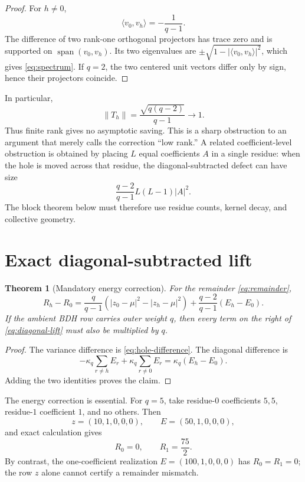 \documentclass[11pt]{article}
\newtheorem{theorem}{Theorem}[section]
\begin{document}
\begin{proof}
For $h\ne0$,
\[
 \langle v_0,v_h\rangle=-\frac1{q-1}.
\]
The difference of two rank-one orthogonal projectors has trace zero and is
supported on $\operatorname{span}(v_0,v_h)$.  Its two eigenvalues are
$\pm\sqrt{1-|\langle v_0,v_h\rangle|^2}$, which gives
\eqref{eq:spectrum}.  If $q=2$, the two centered unit vectors differ only by
sign, hence their projectors coincide.
\end{proof}

In particular,
\[
 \|T_h\|=\frac{\sqrt{q(q-2)}}{q-1}\longrightarrow1.
\]
Thus finite rank gives no asymptotic saving.  This is a sharp obstruction to
an argument that merely calls the correction ``low rank.''  A related
coefficient-level obstruction is obtained by placing $L$ equal coefficients
$A$ in a single residue: when the hole is moved across that residue, the
diagonal-subtracted defect can have size
\[
 \frac{q-2}{q-1}L(L-1)|A|^2.
\]
The block theorem below must therefore use residue counts, kernel decay, and
collective geometry.

\section{Exact diagonal-subtracted lift}

\begin{theorem}[Mandatory energy correction]\label{thm:diagonal}
For the remainder \eqref{eq:remainder},
\begin{equation}\label{eq:diagonal-lift}
 \boxed{
 R_h-R_0=\frac q{q-1}
 \left(|z_0-\mu|^2-|z_h-\mu|^2\right)
 +\frac{q-2}{q-1}(E_h-E_0).}
\end{equation}
If the ambient BDH row carries outer weight $q$, then every term on the
right of \eqref{eq:diagonal-lift} must also be multiplied by $q$.
\end{theorem}

\begin{proof}
The variance difference is \eqref{eq:hole-difference}.  The diagonal
difference is
\[
 -\kappa_q\sum_{r\ne h}E_r+\kappa_q\sum_{r\ne0}E_r
 =\kappa_q(E_h-E_0).
\]
Adding the two identities proves the claim.
\end{proof}

The energy correction is essential.  For $q=5$, take residue-$0$
coefficients $5,5$, residue-$1$ coefficient $1$, and no others.  Then
\[
 z=(10,1,0,0,0),\qquad E=(50,1,0,0,0),
\]
and exact calculation gives
\begin{equation}\label{eq:q5-fixture}
 R_0=0,\qquad R_1=\frac{75}{2}.
\end{equation}
By contrast, the one-coefficient realization $E=(100,1,0,0,0)$ has
$R_0=R_1=0$; the row $z$ alone cannot certify a remainder mismatch.
\end{document}
